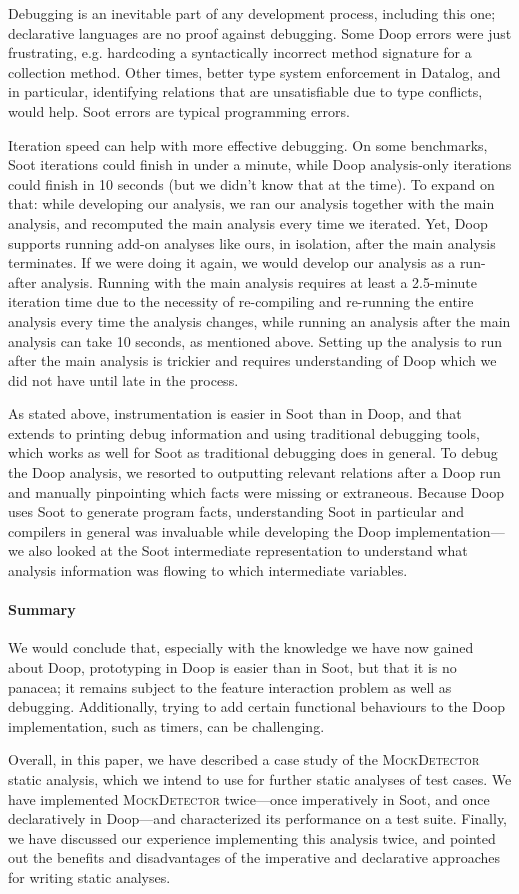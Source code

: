 Debugging is an inevitable part of any development process, including this one; declarative languages are no proof against debugging. Some Doop errors were just frustrating, e.g. hardcoding a syntactically incorrect method signature for a collection method. Other times, better type system enforcement in Datalog, and in particular, identifying relations that are unsatisfiable due to type conflicts, would help. Soot errors are typical programming errors.

Iteration speed can help with more effective debugging. On some benchmarks, Soot iterations could finish in under a minute, while Doop analysis-only iterations could finish in 10 seconds (but we didn't know that at the time). To expand on that: while developing our analysis, we ran our analysis together with the main analysis, and recomputed the main analysis every time we iterated. Yet, Doop supports running add-on analyses like ours, in isolation, after the main analysis terminates. If we were doing it again, we would develop our analysis as a run-after analysis. Running with the main analysis requires at least a 2.5-minute iteration time due to the necessity of re-compiling and re-running the entire analysis every time the analysis changes, while running an analysis after the main analysis can take 10 seconds, as mentioned above. Setting up the analysis to run after the main analysis is trickier and requires understanding of Doop which we did not have until late in the process. 

As stated above, instrumentation is easier in Soot than in Doop, and that extends to printing debug information and using traditional debugging tools, which works as well for Soot as traditional debugging does in general. To debug the Doop analysis, we resorted to outputting relevant relations after a Doop run and manually pinpointing which facts were missing or extraneous. Because Doop uses Soot to generate program facts, understanding Soot in particular and compilers in general was invaluable while developing the Doop implementation---we also looked at the Soot intermediate representation to understand what analysis information was flowing to which intermediate variables.

\paragraph{Summary} We would conclude that, especially with the knowledge we have now gained about Doop, prototyping in Doop is easier than in Soot, but that it is no panacea; it remains subject to the feature interaction problem as well as debugging. Additionally, trying to add certain functional behaviours to the Doop implementation, such as timers, can be challenging.

Overall, in this paper, we have described a case study of the \textsc{MockDetector} static analysis, which we intend to use for further static analyses of test cases. We have implemented \textsc{MockDetector} twice---once imperatively in Soot, and once declaratively in Doop---and characterized its performance on a test suite. Finally, we have discussed our experience implementing this analysis twice, and pointed out the benefits and disadvantages of the imperative and declarative approaches for writing static analyses.